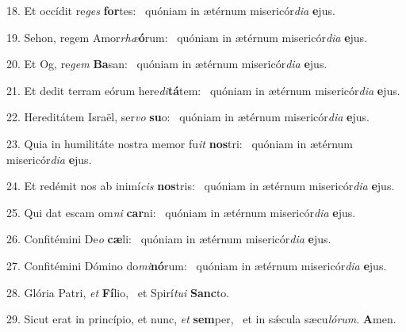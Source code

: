 18. Et occídit re\textit{ges} \textbf{for}tes: \ast\  quóniam in ætérnum misericór\textit{di}\textit{a} \textbf{e}jus.\

19. Sehon, regem Amor\textit{rhæ}\textbf{ó}rum: \ast\  quóniam in ætérnum misericór\textit{di}\textit{a} \textbf{e}jus.\

20. Et Og, re\textit{gem} \textbf{Ba}san: \ast\  quóniam in ætérnum misericór\textit{di}\textit{a} \textbf{e}jus.\

21. Et dedit terram eórum here\textit{di}\textbf{tá}tem: \ast\  quóniam in ætérnum misericór\textit{di}\textit{a} \textbf{e}jus.\

22. Hereditátem Israël, ser\textit{vo} \textbf{su}o: \ast\  quóniam in ætérnum misericór\textit{di}\textit{a} \textbf{e}jus.\

23. Quia in humilitáte nostra memor fu\textit{it} \textbf{nos}tri: \ast\  quóniam in ætérnum misericór\textit{di}\textit{a} \textbf{e}jus.\

24. Et redémit nos ab inimí\textit{cis} \textbf{nos}tris: \ast\  quóniam in ætérnum misericór\textit{di}\textit{a} \textbf{e}jus.\

25. Qui dat escam om\textit{ni} \textbf{car}ni: \ast\  quóniam in ætérnum misericór\textit{di}\textit{a} \textbf{e}jus.\

26. Confitémini De\textit{o} \textbf{cæ}li: \ast\  quóniam in ætérnum misericór\textit{di}\textit{a} \textbf{e}jus.\

27. Confitémini Dómino do\textit{mi}\textbf{nó}rum: \ast\  quóniam in ætérnum misericór\textit{di}\textit{a} \textbf{e}jus.\

28. Glória Patri, \textit{et} \textbf{Fí}lio, \ast\  et Spirí\textit{tu}\textit{i} \textbf{Sanc}to.\

29. Sicut erat in princípio, et nunc, \textit{et} \textbf{sem}per, \ast\  et in sǽcula sæcu\textit{ló}\textit{rum}. \textbf{A}men.\

